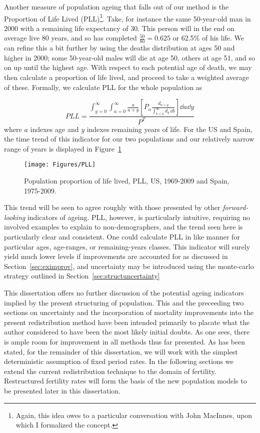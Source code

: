 Another measure of population ageing that falls out of our method is the
Proportion of Life Lived (PLL)\footnote{Again, this idea owes to a
particular conversation with John MacInnes, upon which I formalized the
concept.}. Take, for instance the same 50-year-old man in 2000 with a remaining life expectancy of
30. This person will in the end on average live 80 years, and so has completed
$\tfrac{50}{80} = 0.625$ or 62.5\% of his life. We can refine this a bit further
by using the deaths distribution at ages 50 and higher in 2000; some 50-year-old
males will die at age 50, others at age 51, and so on up until the highest age.
With respect to each potential age of death, we may then calculate a proportion
of life lived, and proceed to take a weighted average of these. Formally, we
calculate PLL for the whole population as

\begin{equation}
PLL = \frac{\int _{y = 0} ^\infty \int _{a = 0} ^\infty \frac{a}{a + y}
\left[ P_a
\frac{d_{a + y} }{ \int _{b = a} ^{\infty} d_b\, \dd b  }\right] \dd a \dd y }{
P^T }
\end{equation}
where $a$ indexes age and $y$ indexes remaining years of life. For the US and
Spain, the time trend of this indicator for our two populations and our
relatively narrow range of years is displayed in Figure~\ref{fig:PLL}
\begin{figure}
      \centering
      \caption{Population proportion of life lived, PLL, US, 1969-2009 and
      Spain, 1975-2009.}
         \texttt{[image: Figures/PLL]}
      \label{fig:PLL} 
\end{figure}

This trend will be seen to agree roughly with those presented by other
\textit{forward-looking} indicators of ageing. PLL, however, is particularly
intuitive, requiring no involved examples to explain to non-demographers, and
the trend seen here is particularly clear and consistent. One could
calculate PLL in like manner for particular ages, age-ranges, or remaining-years
classes. This indicator will surely yield much lower levels if improvements
are accounted for as discussed in Section~\ref{sec:eximprov}, and uncertainty
may be introduced using the monte-carlo strategy outlined in Section~\ref{sec:structuncertainty}

This dissertation offers no further discussion of the
potential ageing indicators implied by the present structuring of population.
This and the preceeding two sections on uncertainty and the incorporation of
mortality improvements into the present redistribution method have been intended
primarily to placate what the author considered to have been the most likely
initial doubts. As one sees, there is ample room for improvement in all methods
thus far presented. As has been stated, for the remainder of this dissertation,
we will work with the simplest deterministic assumption of fixed period rates.
In the following sections we extend the current redistribution technique to the
domain of fertility. Restructured fertility rates will form the basis of the new
population models to be presented later in this dissertation.
\FloatBarrier